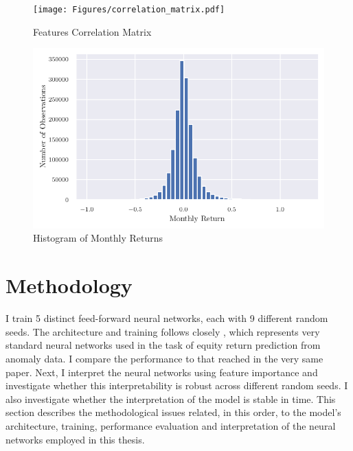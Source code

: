 		\begin{center}
			\begin{figure}
				\texttt{[image: Figures/correlation\_matrix.pdf]}
				\caption{Features Correlation Matrix}
				\label{fig:correlation_matrix}
			\end{figure}
		\end{center}
		
		
		
		\begin{center}
			\begin{figure}
				\includegraphics{Figures/hist_returns.pdf}
				\caption{Histogram of Monthly Returns}
				\label{fig:hist_returns}
			\end{figure}
		\end{center}


\section{Methodology}

	I train 5 distinct feed-forward neural networks, each with 9 different random seeds. The architecture and training follows closely \cite{gu2020empirical}, which represents very standard neural networks used in the task of equity return prediction from anomaly data. I compare the performance to that reached in the very same paper. Next, I interpret the neural networks using feature importance and investigate whether this interpretability is robust across different random seeds. I also investigate whether the interpretation of the model is stable in time. This  section describes the methodological issues related, in this order, to the model's architecture, training, performance evaluation and interpretation of the neural networks employed in this thesis.
	

